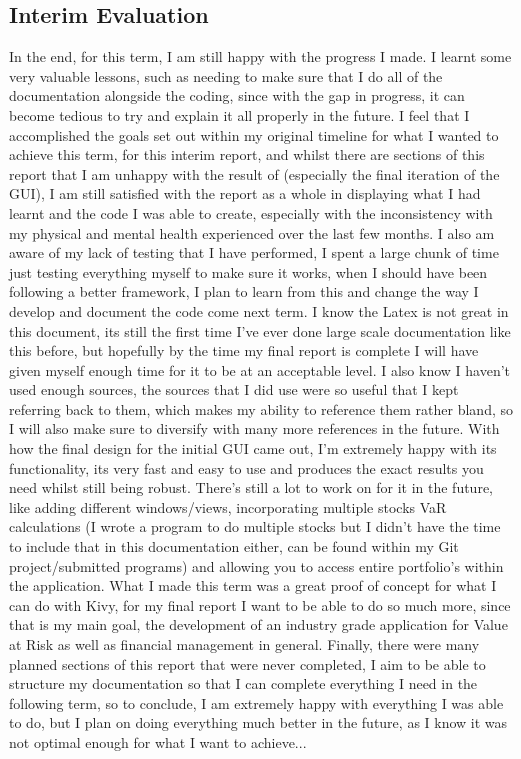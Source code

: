 \documentclass{article}
\begin{document}
\subsection{Interim Evaluation}
In the end, for this term, I am still happy with the progress I made. I learnt some very valuable lessons, such as needing to make sure that I do all of the documentation alongside the coding, since with the gap in progress, it can become tedious to try and explain it all properly in the future. I feel that I accomplished the goals set out within my original timeline for what I wanted to achieve this term, for this interim report, and whilst there are sections of this report that I am unhappy with the result of (especially the final iteration of the GUI), I am still satisfied with the report as a whole in displaying what I had learnt and the code I was able to create, especially with the inconsistency with my physical and mental health experienced over the last few months. I also am aware of my lack of testing that I have performed, I spent a large chunk of time just testing everything myself to make sure it works, when I should have been following a better framework, I plan to learn from this and change the way I develop and document the code come next term. I know the Latex is not great in this document, its still the first time I've ever done large scale documentation like this before, but hopefully by the time my final report is complete I will have given myself enough time for it to be at an acceptable level. I also know I haven't used enough sources, the sources that I did use were so useful that I kept referring back to them, which makes my ability to reference them rather bland, so I will also make sure to diversify with many more references in the future. With how the final design for the initial GUI came out, I'm extremely happy with its functionality, its very fast and easy to use and produces the exact results you need whilst still being robust. There's still a lot to work on for it in the future, like adding different windows/views, incorporating multiple stocks VaR calculations (I wrote a program to do multiple stocks but I didn't have the time to include that in this documentation either, can be found within my Git project/submitted programs) and allowing you to access entire portfolio's within the application. What I made this term was a great proof of concept for what I can do with Kivy, for my final report I want to be able to do so much more, since that is my main goal, the development of an industry grade application for Value at Risk as well as financial management in general. Finally, there were many planned sections of this report that were never completed, I aim to be able to structure my documentation so that I can complete everything I need in the following term, so to conclude, I am extremely happy with everything I was able to do, but I plan on doing everything much better in the future, as I know it was not optimal enough for what I want to achieve...
\end{document}
